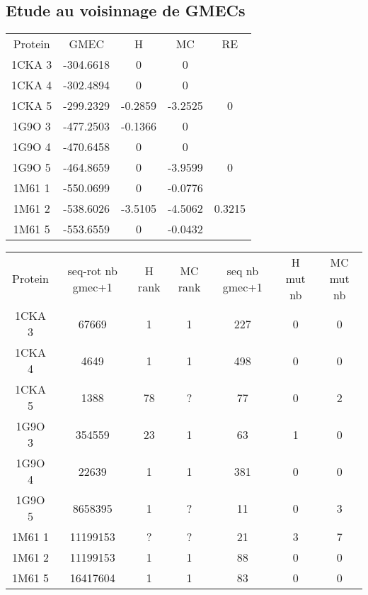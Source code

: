    \subsection{Etude au voisinnage de GMECs}


    \begin{table}[h]
      \centering

      \begin{tabular}{ccccc}


        \toprule
        Protein & GMEC & H & MC & RE \\
        \cmidrule{1-5}
        1CKA 3 & -304.6618 & 0 & 0 & \\
        1CKA 4 & -302.4894 & 0 & 0 & \\
        1CKA 5 & -299.2329 & -0.2859 & -3.2525 & 0 \\
        1G9O 3 & -477.2503 & -0.1366 & 0 & \\
        1G9O 4 & -470.6458 & 0 & 0 & \\
        1G9O 5 & -464.8659 & 0 & -3.9599 &  0 \\
        1M61 1 & -550.0699 & 0 & -0.0776 & \\
        1M61 2 & -538.6026 & -3.5105 & -4.5062 & 0.3215 \\
        1M61 5 & -553.6559 & 0 & -0.0432 & \\
        \bottomrule       
      \end{tabular}      
\label{tab:voisinnage_rappel}      
    \end{table}


    \begin{table}[h]
      \centering

      \begin{tabular}{ccccccc}


        \toprule
        Protein & seq-rot nb gmec+1 & H rank  & MC rank  & seq nb gmec+1 & H mut nb & MC mut nb \\
        \cmidrule{1-7}
        1CKA 3 & 67669 & 1 & 1 & 227 & 0 & 0 \\
        1CKA 4 & 4649 & 1 & 1 & 498 & 0 & 0 \\
        1CKA 5 & 1388 & 78 & ? & 77 & 0 & 2 \\
        1G9O 3 & 354559 & 23 & 1 & 63 & 1 & 0 \\
        1G9O 4 & 22639 & 1 & 1 & 381 & 0 & 0 \\
        1G9O 5 & 8658395 & 1 & ? &  11 & 0 & 3 \\
        1M61 1 & 11199153 & ? & ? & 21 & 3 & 7 \\
        1M61 2 & 11199153 & 1 & 1 & 88 & 0 & 0 \\
        1M61 5 & 16417604 & 1 & 1 & 83 & 0 & 0 \\
        \bottomrule
      \end{tabular} 
\label{tab:etude_au_voisinnage}           
\end{table}



